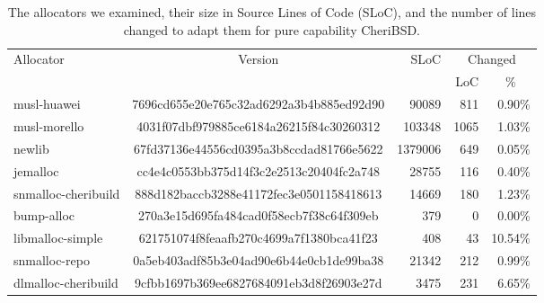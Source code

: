 \begin{table}[tb]
\begin{center}
\begin{tabular}{lcrrr}
\toprule
Allocator & Version & SLoC & \multicolumn{2}{c}{Changed}\\
\cmidrule(lr){4-5}
  &   &   & LoC & \multicolumn{1}{c}{\%}\\
\midrule
musl-huawei & \small{7696cd655e20e765c32ad6292a3b4b885ed92d90} & 90089 & 811 & 0.90\%\\
musl-morello & \small{4031f07dbf979885ce6184a26215f84c30260312} & 103348 & 1065 & 1.03\%\\
newlib & \small{67fd37136e44556cd0395a3b8ccdad81766e5622} & 1379006 & 649 & 0.05\%\\
jemalloc & \small{cc4e4c0553bb375d14f3c2e2513c20404fc2a748} & 28755 & 116 & 0.40\%\\
snmalloc-cheribuild & \small{888d182baccb3288e41172fec3e0501158418613} & 14669 & 180 & 1.23\%\\
bump-alloc & \small{270a3e15d695fa484cad0f58ecb7f38c64f309eb} & 379 & 0 & 0.00\%\\
libmalloc-simple & \small{621751074f8feaafb270c4699a7f1380bca41f23} & 408 & 43 & 10.54\%\\
snmalloc-repo & \small{0a5eb403adf85b3e04ad90e6b44e0cb1de99ba38} & 21342 & 212 & 0.99\%\\
dlmalloc-cheribuild & \small{9cfbb1697b369ee6827684091eb3d8f26903e27d} & 3475 & 231 & 6.65\%
\\ \bottomrule
\end{tabular}
\end{center}
\caption{The allocators we examined, their size in Source Lines of Code (SLoC), and the number of lines changed to adapt them for pure capability CheriBSD.}
\label{tab:allocator_summary}
\end{table}